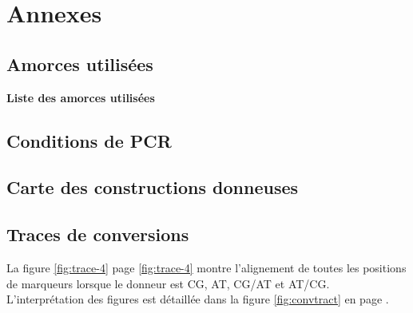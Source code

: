 \newpage
{}
\setcounter{page}{1}

\begin{multicols}{2}
\rmfamily
\footnotesize

\end{multicols}
\newpage


\setcounter{section}{0}
\section{Annexes}


\setcounter{subsection}{1}
\subsection{Amorces utilisées}
\label{subsec:annexe-amorces}


\caption[Liste des amorces utilisées]{\label{fig:amorces}\textbf{Liste des
    amorces utilisées}}

\subsection{Conditions de PCR}
\label{subsec:annexe-pcr}

\subsection{Carte des constructions donneuses}
\label{subsec:cartes-plasmides}



\subsection{Traces de conversions}
\label{subsec:trac-de-conv}

La figure \ref{fig:trace-4} page \ref{fig:trace-4} montre l'alignement de toutes
les positions de marqueurs lorsque le donneur est CG, AT, CG/AT et AT/CG.
L'interprétation des figures est détaillée dans la figure \ref{fig:convtract} en
page \pageref{fig:convtract}.

